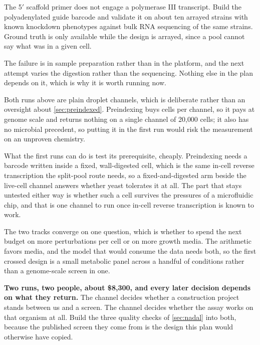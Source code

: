  The 5$'$ scaffold primer does not engage a
polymerase III transcript. Build the polyadenylated guide barcode and validate
it on about ten arrayed strains with known knockdown phenotypes against bulk RNA
sequencing of the same strains. Ground truth is only available while the design
is arrayed, since a pool cannot say what was in a given cell.

 The failure is in
sample preparation rather than in the platform, and the next attempt varies the
digestion rather than the sequencing. Nothing else in the plan depends on it,
which is why it is worth running now.

 Both
runs above are plain droplet channels, which is deliberate rather than an
oversight about \cref{sec:preindexed}. Preindexing buys cells per channel, so it
pays at genome scale and returns nothing on a single channel of 20{,}000 cells;
it also has no microbial precedent, so putting it in the first run would risk the
measurement on an unproven chemistry.

What the first runs can do is test its prerequisite, cheaply. Preindexing needs a
barcode written inside a fixed, wall-digested cell, which is the same in-cell
reverse transcription the split-pool route needs, so a fixed-and-digested arm
beside the live-cell channel answers whether yeast tolerates it at all. The part
that stays untested either way is whether such a cell survives the pressures of a
microfluidic chip, and that is one channel to run once in-cell reverse
transcription is known to work.

 The two tracks converge on one question, which is whether
to spend the next budget on more perturbations per cell or on more growth media.
The arithmetic favors media, and the model that would consume the data needs
both, so the first crossed design is a small metabolic panel across a handful of
conditions rather than a genome-scale screen in one.

\begin{keybox}
\textbf{Two runs, two people, about \$8{,}300, and every later decision depends
on what they return.} The  channel decides whether a
construction project stands between us and a screen. The
 channel decides whether the assay works on that organism
at all. Build the three quality checks of \cref{sec:nadal} into both, because
the published screen they come from is the design this plan would otherwise have
copied.
\end{keybox}
